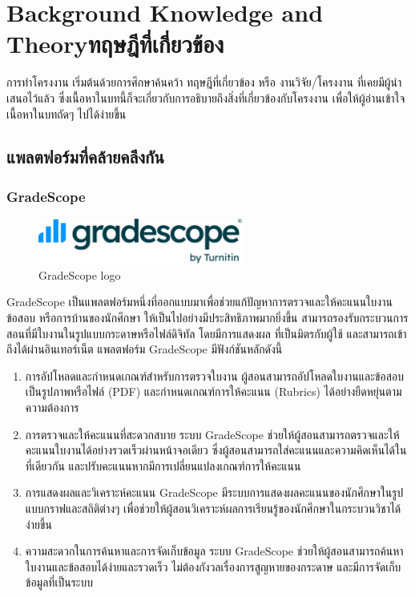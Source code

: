 \chapter{\ifenglish Background Knowledge and Theory\else ทฤษฎีที่เกี่ยวข้อง\fi}

\qquad การทำโครงงาน เริ่มต้นด้วยการศึกษาค้นคว้า ทฤษฎีที่เกี่ยวข้อง หรือ งานวิจัย/โครงงาน ที่เคยมีผู้นำเสนอไว้แล้ว
ซึ่งเนื้อหาในบทนี้ก็จะเกี่ยวกับการอธิบายถึงสิ่งที่เกี่ยวข้องกับโครงงาน เพื่อให้ผู้อ่านเข้าใจเนื้อหาในบทถัดๆ ไปได้ง่ายขึ้น

\section{แพลตฟอร์มที่คล้ายคลึงกัน}
  \subsection{GradeScope}
    \begin{figure}[!h]
      \centering
      \includegraphics[width=0.6\textwidth]{image/Background/gradescope-logo.png}
      \caption[GradeScope]{GradeScope logo}
      \label{fig:gradescope_pic}
    \end{figure}
    \FloatBarrier
    \qquad GradeScope เป็นแพลตฟอร์มหนึ่งที่ออกแบบมาเพื่อช่วยแก้ปัญหาการตรวจและให้คะแนนใบงาน ข้อสอบ หรือการบ้านของนักศึกษา
    ให้เป็นไปอย่างมีประสิทธิภาพมากยิ่งขึ้น สามารถรองรับกระบวนการสอนที่มีใบงานในรูปแบบกระดาษหรือไฟล์ดิจิทัล โดยมีการแสดงผล
    ที่เป็นมิตรกับผู้ใช้ และสามารถเข้าถึงได้ผ่านอินเทอร์เน็ต แพลตฟอร์ม GradeScope มีฟังก์ชันหลักดังนี้
      \begin{enumerate}
        \item การอัปโหลดและกำหนดเกณฑ์สำหรับการตรวจใบงาน ผู้สอนสามารถอัปโหลดใบงานและข้อสอบเป็นรูปภาพหรือไฟล์ (PDF) และกำหนดเกณฑ์การให้คะแนน (Rubrics) ได้อย่างยืดหยุ่นตามความต้องการ
        \item การตรวจและให้คะแนนที่สะดวกสบาย ระบบ GradeScope ช่วยให้ผู้สอนสามารถตรวจและให้คะแนนใบงานได้อย่างรวดเร็วผ่านหน้าจอเดียว ซึ่งผู้สอนสามารถใส่คะแนนและความคิดเห็นได้ในที่เดียวกัน และปรับคะแนนหากมีการเปลี่ยนแปลงเกณฑ์การให้คะแนน
        \item การแสดงผลและวิเคราะห์คะแนน GradeScope มีระบบการแสดงผลคะแนนของนักศึกษาในรูปแบบกราฟและสถิติต่างๆ เพื่อช่วยให้ผู้สอนวิเคราะห์ผลการเรียนรู้ของนักศึกษาในกระบวนวิชาได้ง่ายขึ้น
        \item ความสะดวกในการค้นหาและการจัดเก็บข้อมูล ระบบ GradeScope ช่วยให้ผู้สอนสามารถค้นหาใบงานและข้อสอบได้ง่ายและรวดเร็ว ไม่ต้องกังวลเรื่องการสูญหายของกระดาษ และมีการจัดเก็บข้อมูลที่เป็นระบบ
      \end{enumerate}
